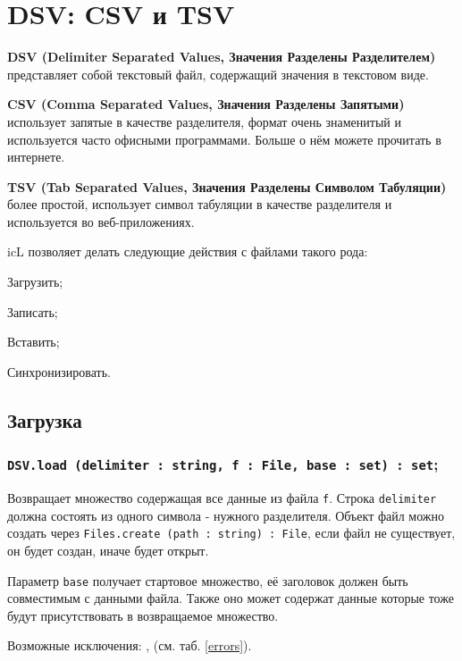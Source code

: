 \section{DSV: CSV и TSV}

{\bf DSV (Delimiter Separated Values, Значения Разделены Разделителем)} представляет собой текстовый файл, содержащий значения в текстовом виде.

{\bf CSV (Comma Separated Values, Значения Разделены Запятыми)} использует запятые в качестве разделителя, формат очень знаменитый и используется часто офисными программами. Больше о нём можете прочитать в интернете.

{\bf TSV (Tab Separated Values, Значения Разделены Символом Табуляции)} более простой, использует символ табуляции в качестве разделителя и используется во веб-приложениях.

icL позволяет делать следующие действия с файлами такого рода:
\begin{icItems}
	\item Загрузить;
	\item Записать;
	\item Вставить;
	\item Синхронизировать.
\end{icItems}

\subsection{Загрузка}

\subsubsection{\texttt{DSV.load (delimiter : string, f : File, base : set) : set};}

Возвращает множество содержащая все данные из файла \texttt{f}. Строка \texttt{delimiter} должна состоять из одного символа - нужного разделителя. Объект файл можно создать через \texttt{Files.create (path : string) : File}, если файл не существует, он будет создан, иначе будет открыт.

Параметр \texttt{base} получает стартовое множество, её заголовок должен быть совместимым с данными файла. Также оно может содержат данные которые тоже будут присутствовать в возвращаемое множество. 

Возможные исключения: ,  (см. таб. \ref{errors}).

